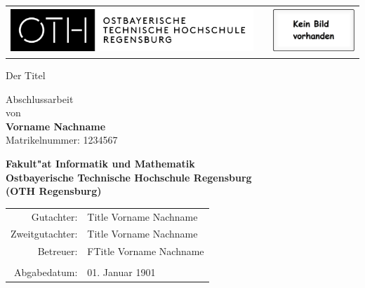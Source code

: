 %
%

\begin{titlepage}


\FloatBarrier
\begin{table}[htb]\vspace{1ex}\centering
\begin{tabular}{ccc}
 \includegraphics[height=1.7cm]{img/logo_OTH.png}
   &    &
 \includegraphics[height=1.7cm]{img/kein_bild_vorhanden.eps}
   \\
\end{tabular}
\end{table}
\FloatBarrier


\begin{center}
\rule{0pt}{0pt}
\vfill
\vfill
\vfill
\vfill

\begin{huge}
Der Titel  \\[0.75ex]
\end{huge}

\vfill
\vfill

Abschlussarbeit\\ von\\

\vspace*{.5cm}
\textbf{Vorname Nachname}\\
Matrikelnummer: 1234567
\vspace{.5cm}

\vfill
\vfill
\textbf{\large Fakult"at Informatik und Mathematik\\
Ostbayerische Technische Hochschule Regensburg\\
(OTH Regensburg)}
\vfill
\vfill

\begin{tabular}{rl}
Gutachter:   & Title Vorname Nachname\\
Zweitgutachter:   & Title Vorname Nachname\\
Betreuer:   & FTitle Vorname Nachname\\
\\Abgabedatum:& 01. Januar 1901
\end{tabular}
\end{center}
\end{titlepage}

